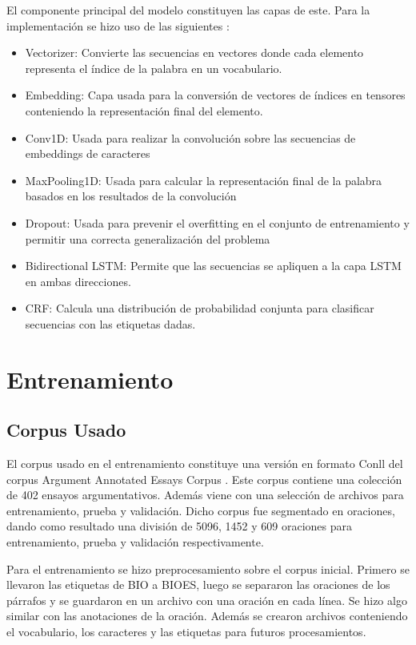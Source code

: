 \documentclass[runningheads]{llncs}
\begin{document}
El componente principal del modelo constituyen las capas de este. Para la implementación
se hizo uso de las siguientes \cite{tensorflowDoc} \cite{kerasDoc}:

\begin{itemize}
	\item Vectorizer: Convierte las secuencias en vectores donde cada elemento representa el
	índice de la palabra en un vocabulario.
	\item Embedding: Capa usada para la conversión de vectores de índices en tensores conteniendo
	la representación final del elemento.
	\item Conv1D: Usada para realizar la convolución sobre las secuencias de embeddings de
	caracteres
	\item MaxPooling1D: Usada para calcular la representación final de la palabra basados 
	en los resultados de la convolución
	\item Dropout: Usada para prevenir el overfitting en el conjunto de entrenamiento y
	permitir una correcta generalización del problema
	\item Bidirectional LSTM: Permite que las secuencias se apliquen a la capa LSTM en ambas
	direcciones.
	\item CRF: Calcula una distribución de probabilidad conjunta para clasificar secuencias
	con las etiquetas dadas.
\end{itemize}

\section{Entrenamiento}

\subsection{Corpus Usado}

El corpus usado en el entrenamiento constituye una versión en formato
Conll del corpus Argument Annotated Essays Corpus \cite{corpus}. Este corpus contiene una 
colección de 402 ensayos argumentativos. Además viene con una selección de archivos
para entrenamiento, prueba y validación. Dicho corpus fue segmentado
en oraciones, dando como resultado una división de 5096, 1452 y 609 oraciones para
entrenamiento, prueba y validación respectivamente. 

Para el entrenamiento se hizo preprocesamiento sobre el corpus inicial. Primero se llevaron
las etiquetas de BIO a BIOES, luego se separaron las oraciones de los párrafos y se guardaron
en un archivo con una oración en cada línea. Se hizo algo similar con las anotaciones de la oración.
Además se crearon archivos conteniendo el vocabulario, los caracteres y las etiquetas para futuros
procesamientos.
\end{document}
